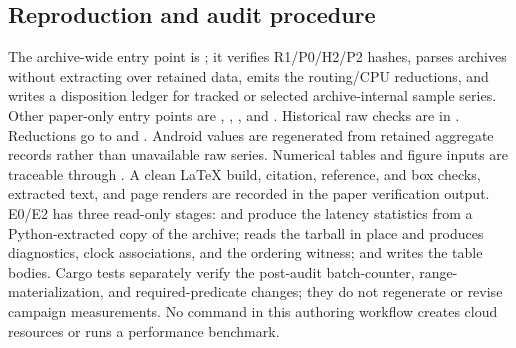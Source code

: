 \subsection{Reproduction and audit procedure}
The archive-wide entry point is ; it verifies R1/P0/H2/P2 hashes, parses archives without extracting over retained data, emits the routing/CPU reductions, and writes a disposition ledger for tracked or selected archive-internal sample series. Other paper-only entry points are , , , and . Historical raw checks are in . Reductions go to  and . Android values are regenerated from retained aggregate records rather than unavailable raw series. Numerical tables and figure inputs are traceable through . A clean LaTeX build, citation, reference, and box checks, extracted text, and page renders are recorded in the paper verification output. E0/E2 has three read-only stages:  and  produce the latency statistics from a Python-extracted copy of the archive;  reads the tarball in place and produces diagnostics, clock associations, and the ordering witness; and  writes the table bodies. Cargo tests separately verify the post-audit batch-counter, range-materialization, and required-predicate changes; they do not regenerate or revise campaign measurements. No command in this authoring workflow creates cloud resources or runs a performance benchmark.
